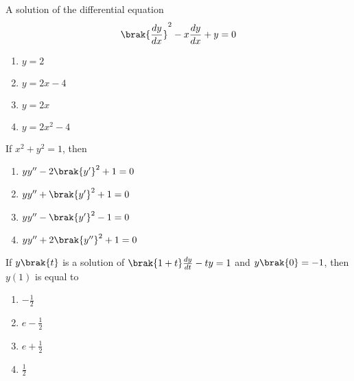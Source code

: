 \iffalse
\title{CHAPTER - 19\\Differential Equations}
\author{AI24BTECH11028 - Ronit Ranjan}
\section{mcq-single}
\fi

\item A solution of the differential equation \hfill {}
\begin{align}
\brak{\frac{dy}{dx}}^2 - x \frac{dy}{dx} + y = 0 
\end{align}
\begin{multicols}{2}
\begin{enumerate}
    \item $y = 2$
    \item $y = 2x -4$
    \item $y = 2x$
    \item $y = 2x^{2}-4$
\end{enumerate}
\end{multicols}

\item If $x^2 + y^2 = 1$, then \hfill {}
\begin{multicols}{2}
\begin{enumerate}
    \item  $yy^{\prime\prime}-2\brak{y^\prime}^{2}+1 = 0$
    \item  $yy^{\prime\prime}+\brak{y^\prime}^{2}+1 = 0$
    \item  $yy^{\prime\prime}-\brak{y^\prime}^{2}-1 = 0$
    \item  $yy^{\prime\prime}+2\brak{y'^\prime}^{2}+1 = 0$
\end{enumerate}
\end{multicols}

\item If $y\brak{t}$ is a solution of $\brak{1 + t} \frac{dy}{dt} - ty = 1$ and $y\brak{0} = -1$, then $y(1)$ is equal to\hfill {}
\begin{multicols}{2}
\begin{enumerate}
    \item $-\frac{1}{2}$
    \item $e - \frac{1}{2}$
    \item $e + \frac{1}{2}$
    \item $\frac{1}{2}$
\end{enumerate}
\end{multicols}

